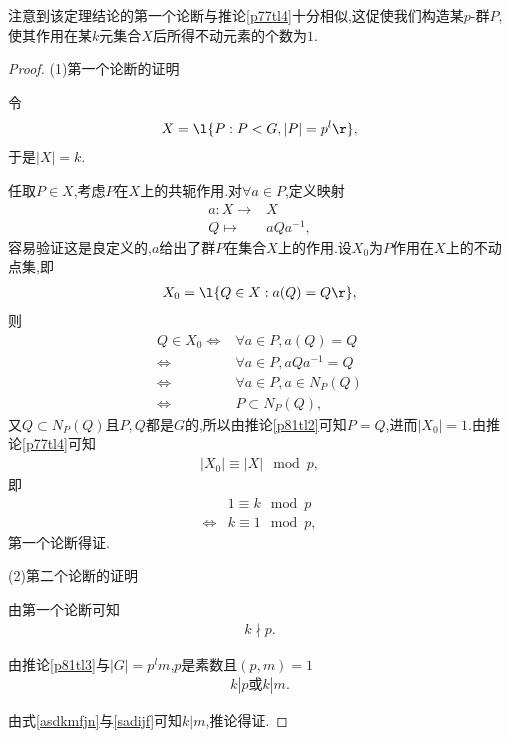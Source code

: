 \begin{analysis}
    注意到该定理结论的第一个论断与推论\ref{p77tl4}十分相似,这促使我们构造某$p$-群$P$,使其作用在某$k$元集合$X$后所得不动元素的个数为$1$.
\end{analysis}
\begin{proof}
    (1)第一个论断的证明
    
    令\begin{align*}
        X=\l\{P:P<G,|P|=p^l\r\},
    \end{align*}于是$|X|=k$.

    任取$P\in X$,考虑$P$在$X$上的共轭作用.对$\forall a\in P$,定义映射\begin{align*}
        a:X\to&X\\
        Q\mapsto&aQa^{-1},
    \end{align*}容易验证这是良定义的,$a$给出了群$P$在集合$X$上的作用.设$X_0$为$P$作用在$X$上的不动点集,即\begin{align*}
        X_0=\l\{Q\in X:a(Q)=Q\r\},
    \end{align*}则\begin{align*}
        Q\in X_0\iff&\forall a\in P,a(Q)=Q\\
        \iff&\forall a\in P,aQa^{-1}=Q\\
        \iff&\forall a\in P,a\in N_P(Q)\\
        \iff&P\subset N_P(Q),
    \end{align*}又$Q\subset N_P(Q)$且$P,Q$都是$G$的,所以由推论\ref{p81tl2}可知$P=Q$,进而$|X_0|=1$.由推论\ref{p77tl4}可知\begin{align*}
        |X_0|\equiv|X|\mod p,
    \end{align*}即\begin{align*}
        &1\equiv k\mod p\\
        \iff&k\equiv1\mod p,
    \end{align*}第一个论断得证.

    (2)第二个论断的证明

    由第一个论断可知\begin{align}\label{sadijf}
        k\nmid p.
    \end{align}
    
    由推论\ref{p81tl3}与$|G|=p^lm$,$p$是素数且$(p,m)=1$\begin{align}
        k|p\text{或}k|m.\label{asdkmfjn}
    \end{align}

    由式\eqref{asdkmfjn}与\eqref{sadijf}可知$k|m$,推论得证.
\end{proof}

